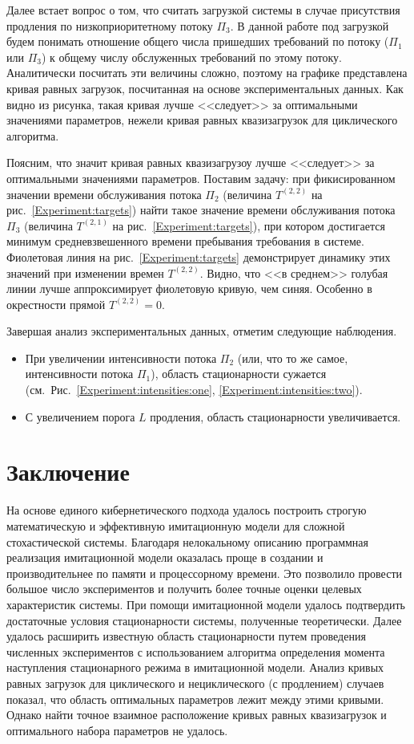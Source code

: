 \documentclass[11pt]{ubs}
\begin{document}
Далее встает вопрос о том, что считать загрузкой системы в случае присутствия продления по низкоприоритетному потоку $\Pi_3$. В данной работе под загрузкой будем понимать отношение общего числа пришедших требований по потоку ($\Pi_1$ или $\Pi_3$) к общему числу обслуженных требований по этому потоку. Аналитически посчитать эти величины сложно, поэтому на графике представлена кривая равных загрузок, посчитанная на основе экспериментальных данных. Как видно из рисунка, такая кривая лучше <<следует>> за оптимальными значениями параметров, нежели кривая равных квазизагрузок для циклического алгоритма.

Поясним, что значит кривая равных квазизагрузоу лучше <<следует>> за оптимальными значениями параметров. Поставим задачу: при фикисированном значении времени обслуживания потока $\Pi_2$ (величина $T^{(2,2)}$ на рис.~\ref{Experiment:targets}) найти такое значение времени обслуживания потока $\Pi_3$ (величина $T^{(2,1)}$ на рис.~\ref{Experiment:targets}), при котором достигается минимум средневзвешенного времени пребывания требования в системе. Фиолетовая линия на рис.~\ref{Experiment:targets} демонстрирует динамику этих значений при изменении времен $T^{(2,2)}$. Видно, что <<в среднем>> голубая линии лучше аппроксимирует фиолетовую кривую, чем синяя. Особенно в окрестности прямой $T^{(2,2)}=0$. 

Завершая анализ экспериментальных данных, отметим следующие наблюдения.
\begin{itemize}
    \item При увеличении интенсивности потока $\Pi_2$ (или, что то же самое, интенсивности потока $\Pi_1$), область  стационарности сужается (см.~Рис.~\ref{Experiment:intensities:one}, \ref{Experiment:intensities:two}).
    \item С увеличением порога $L$ продления, область стационарности увеличивается.
\end{itemize}

\section{Заключение}
На основе единого кибернетического подхода удалось построить строгую математическую и эффективную имитационную модели для сложной стохастической системы. Благодаря нелокальному описанию программная реализация имитационной модели оказалась проще в создании и производительнее по памяти и процессорному времени. Это позволило провести большое число экспериментов и получить более точные оценки целевых характеристик системы. При помощи имитационной модели удалось подтвердить достаточные условия стационарности системы, полученные теоретически. Далее удалось расширить известную область стационарности путем проведения численных экспериментов с использованием алгоритма определения момента наступления стационарного режима в имитационной модели. Анализ кривых равных загрузок для циклического и нециклического (с продлением) случаев показал, что область оптимальных параметров лежит между этими кривыми. Однако найти точное взаимное расположение кривых равных квазизагрузок и оптимального набора параметров не удалось.
\end{document}
